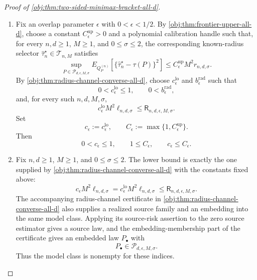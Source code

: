 \begin{proof}[Proof of \cref{obj:thm:two-sided-minimax-bracket-all-d}]
\begin{enumerate}
\item Fix an overlap parameter \(\epsilon\) with \(0<\epsilon<1/2\).  By
\cref{obj:thm:frontier-upper-all-d}, choose a constant
\(C_{\epsilon}^{\mathrm{up}}>0\) and a polynomial calibration handle such that, for every
\(n,d\ge1\), \(M\ge1\), and \(0\le\sigma\le2\), the corresponding known-radius selector
\(\widehat\tau_n^{\star}\in\mathcal T_{n,M}\) satisfies
\[
\sup_{P\in\mathcal P_{d,\epsilon,M,\sigma}}
E_{Q_P^{(n)}}\!\left[
\{\widehat\tau_n^{\star}-\tau(P)\}^2
\right]
\le
C_{\epsilon}^{\mathrm{up}}M^2 r_{n,d,\sigma}.
\]
By \cref{obj:thm:radius-channel-converse-all-d}, choose
\(c_{\epsilon}^{\mathrm{lo}}\) and \(b_{\epsilon}^{\mathrm{rad}}\) such that
\[
0<c_{\epsilon}^{\mathrm{lo}}\le1,\qquad 0<b_{\epsilon}^{\mathrm{rad}},
\]
and, for every such \(n,d,M,\sigma\),
\[
c_{\epsilon}^{\mathrm{lo}}M^2\ell_{n,d,\sigma}
\le
\mathsf R_{n,d,\epsilon,M,\sigma}.
\]
Set
\[
c_{\epsilon}:=c_{\epsilon}^{\mathrm{lo}},
\qquad
C_{\epsilon}:=\max\{1,C_{\epsilon}^{\mathrm{up}}\}.
\]
Then
\[
0<c_{\epsilon}\le1,\qquad 1\le C_{\epsilon},\qquad c_{\epsilon}\le C_{\epsilon}.
\] %

\item Fix \(n,d\ge1\), \(M\ge1\), and \(0\le\sigma\le2\).  The lower bound is exactly the
one supplied by \cref{obj:thm:radius-channel-converse-all-d} with the constants fixed above:
\[
c_{\epsilon}M^2\ell_{n,d,\sigma}
=
c_{\epsilon}^{\mathrm{lo}}M^2\ell_{n,d,\sigma}
\le
\mathsf R_{n,d,\epsilon,M,\sigma}.
\]
The accompanying radius-channel certificate in
\cref{obj:thm:radius-channel-converse-all-d} also supplies a realized source family and an
embedding into the same model class.  Applying its source-risk assertion to the zero source
estimator gives a source law, and the embedding-membership part of the certificate gives an
embedded law \(P_{\bullet}\) with
\[
P_{\bullet}\in\mathcal P_{d,\epsilon,M,\sigma}.
\]
Thus the model class is nonempty for these indices. %


\end{enumerate}
\end{proof}

